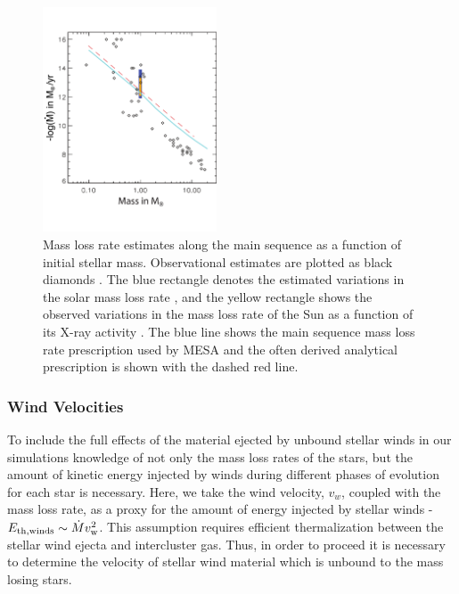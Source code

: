 \documentclass[fleqn,usenatbib]{mnras}
\begin{document}
\begin{figure}
\centering\includegraphics[width=0.46\textwidth]{mdotms_withAnalytic_mod3.pdf}
\caption{Mass loss rate estimates along the main sequence as a function of initial stellar mass.  Observational estimates are plotted as black diamonds \citep{cranmer2011,dejager1988,searle2008,waters1987,debes2006,badalyan1992,morin2008}.  The blue rectangle denotes the estimated variations in the solar mass loss rate \citep{wood2005}, and the yellow rectangle shows the observed variations in the mass loss rate of the Sun as a function of its X-ray activity \citep{cohen2011}.  The blue line shows the main sequence mass loss rate prescription used by MESA and the often derived analytical prescription is shown with the dashed red line. }
\label{fig:msmassloss}
\end{figure} 


\subsubsection{Wind Velocities}

To include the full effects of the material ejected by unbound stellar winds in our simulations knowledge of not only the mass loss rates of the stars, but the amount of kinetic energy injected by winds during different phases of evolution for each star is necessary.  Here, we take the wind velocity, $v_w$, coupled with the mass loss rate, as a proxy for the amount of energy injected by stellar winds - $E_{\rm th,winds} \sim \dot{M} v_{\rm w}^2$.
This assumption requires efficient thermalization between the stellar wind ejecta and intercluster gas.  Thus, in order to proceed it is necessary to determine the velocity of stellar wind material which is unbound to the mass losing stars.
\end{document}
